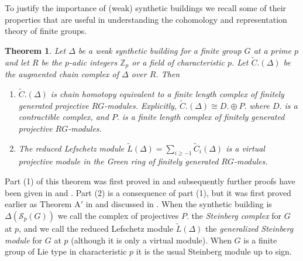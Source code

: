 \documentclass[12pt]{amsart}
\theoremstyle{plain}
\newtheorem{theorem}{Theorem}[section]
\theoremstyle{definition}
\theoremstyle{remark}
\numberwithin{equation}{section}
\def\ZZ{{\mathbb Z}}
\newcommand{\SpCpx}[2]{\Delta(\mathcal{S}_{#2}(#1))}
\begin{document}
To justify the importance of (weak) synthetic buildings we recall some of their properties that are useful in understanding the cohomology and representation theory of finite groups. 


\begin{theorem}
\label{structure-theorem-for-chain-complex}
    Let $\Delta$ be a weak synthetic building for a finite group $G$ at a prime $p$ and let $R$ be the $p$-adic integers $\ZZ_p$ or a field of characteristic $p$. Let $\tilde C.(\Delta)$ be the augmented chain complex of $\Delta$ over $R$. Then
    \begin{enumerate}
        \item $\tilde C.(\Delta)$ is chain homotopy equivalent to a finite length complex of finitely generated projective $RG$-modules. Explicitly, $\tilde C.(\Delta)\cong D.\oplus P.$ where $D.$ is a contractible complex, and $P.$ is a finite length complex of finitely generated projective $RG$-modules.
        \item The reduced Lefschetz module $\tilde L(\Delta) =\sum_{i\ge -1} \tilde C_i(\Delta)$ is a virtual projective module in the Green ring of finitely generated $RG$-modules.
    \end{enumerate}
\end{theorem}

Part (1) of this theorem was first proved in \cite[Thm. 2.7.1]{Web1991} and subsequently further proofs have been given in \cite[Cor. 7.10]{Bou1998} and \cite[Cor. 6.7]{Sym2005}. Part (2) is a consequence of part (1), but it was first proved earlier as Theorem A$'$ in \cite{Web1987-1} and discussed in \cite{Web1987-2}. When the synthetic building is $\SpCpx{G}{p}$ we call the complex of projectives $P.$ the \textit{Steinberg complex} for $G$ at $p$, and we call the reduced Lefschetz module $\tilde L(\Delta)$ the \textit{generalized Steinberg module} for $G$ at $p$ (although it is only a virtual module). When $G$ is a finite group of Lie type in characteristic $p$ it is the usual Steinberg module up to sign.


\end{document}
